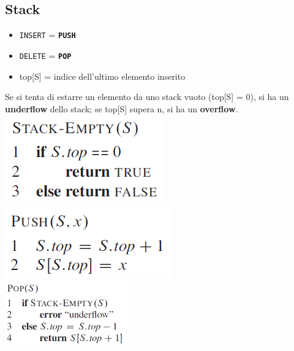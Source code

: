 \documentclass[11pt,a4paper]{article}
\begin{document}
\subsection{Stack}
\begin{itemize}[leftmargin=*, noitemsep]
  \item \texttt{INSERT} = \texttt{\textbf{PUSH}}
  \item \texttt{DELETE} = \texttt{\textbf{POP}}
  \item top[S] = indice dell’ultimo elemento inserito
\end{itemize}
Se si tenta di estarre un elemento da uno stack vuoto (top[S] = 0), si ha un \textbf{underflow} dello stack; se top[S]
supera n, si ha un \textbf{overflow}.\medskip\\
\includegraphics[scale=0.35]{img/stack1.png}\ \ \ \ \
\includegraphics[scale=0.35]{img/stack2.png}\ \ \ \ \
\includegraphics[scale=0.7]{img/stack3.png}
\end{document}

